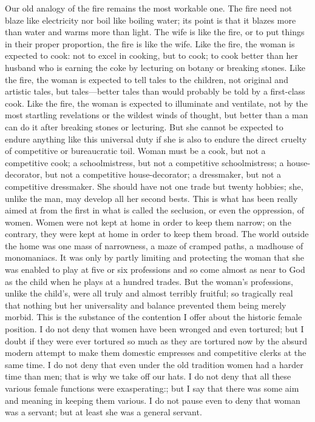 \documentclass{book}
\begin{document}
Our old analogy of the fire remains the most workable one. The fire need not blaze like electricity nor boil like boiling water; its point is that it blazes more than water and warms more than light. The wife is like the fire, or to put things in their proper proportion, the fire is like the wife. Like the fire, the woman is expected to cook: not to excel in cooking, but to cook; to cook better than her husband who is earning the coke by lecturing on botany or breaking stones. Like the fire, the woman is expected to tell tales to the children, not original and artistic tales, but tales—better tales than would probably be told by a first-class cook. Like the fire, the woman is expected to illuminate and ventilate, not by the most startling revelations or the wildest winds of thought, but better than a man can do it after breaking stones or lecturing. But she cannot be expected to endure anything like this universal duty if she is also to endure the direct cruelty of competitive or bureaucratic toil. Woman must be a cook, but not a competitive cook; a schoolmistress, but not a competitive schoolmistress; a house-decorator, but not a competitive house-decorator; a dressmaker, but not a competitive dressmaker. She should have not one trade but twenty hobbies; she, unlike the man, may develop all her second bests. This is what has been really aimed at from the first in what is called the seclusion, or even the oppression, of women. Women were not kept at home in order to keep them narrow; on the contrary, they were kept at home in order to keep them broad. The world outside the home was one mass of narrowness, a maze of cramped paths, a madhouse of monomaniacs. It was only by partly limiting and protecting the woman that she was enabled to play at five or six professions and so come almost as near to God as the child when he plays at a hundred trades. But the woman’s professions, unlike the child’s, were all truly and almost terribly fruitful; so tragically real that nothing but her universality and balance prevented them being merely morbid. This is the substance of the contention I offer about the historic female position. I do not deny that women have been wronged and even tortured; but I doubt if they were ever tortured so much as they are tortured now by the absurd modern attempt to make them domestic empresses and competitive clerks at the same time. I do not deny that even under the old tradition women had a harder time than men; that is why we take off our hats. I do not deny that all these various female functions were exasperating:; but I say that there was some aim and meaning in keeping them various. I do not pause even to deny that woman was a servant; but at least she was a general servant.
\end{document}
